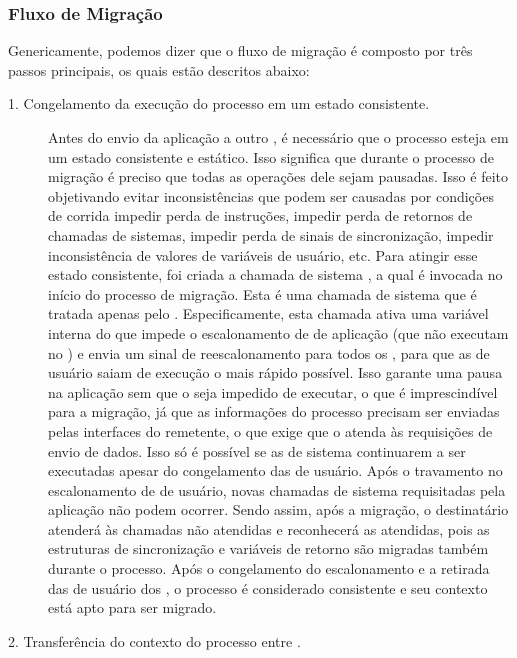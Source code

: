 \subsubsection{Fluxo de Migração}\label{sec.fluxo-migracao}

Genericamente, podemos dizer que o fluxo de migração é composto por três passos principais, os quais estão descritos abaixo:
\begin{description}
	\item[1. Congelamento da execução do processo em um estado consistente.] \hfill
	
    Antes do envio da aplicação a outro \cluster, é necessário que o processo esteja em um estado consistente e estático. Isso significa que durante o processo de migração é preciso que todas as operações dele sejam pausadas. Isso é feito objetivando evitar inconsistências que podem ser causadas por condições de corrida \eg impedir perda de instruções, impedir perda de retornos de chamadas de sistemas, impedir perda de sinais de sincronização, impedir inconsistência de valores de variáveis de usuário, etc. 
    Para atingir esse estado consistente, foi criada a chamada de sistema \freeze, a qual é invocada no início do processo de migração. Esta é uma chamada de sistema que é tratada apenas pelo \mcore. Especificamente, esta chamada ativa uma variável interna do \so que impede o escalonamento de \threads de aplicação (\threads que não executam no \mcore) e envia um sinal de reescalonamento para todos os \scores, para que as \threads de usuário saiam de execução o mais rápido possível. Isso garante uma pausa na aplicação sem que o \so seja impedido de executar, o que é imprescindível para a migração, já que as informações do processo precisam ser enviadas pelas interfaces \noc do \cluster remetente, o que exige que o \so atenda às requisições de envio de dados. Isso só é possível se as \threads de sistema continuarem a ser executadas apesar do congelamento das de usuário.
    Após o travamento no escalonamento de \threads de usuário, novas chamadas de sistema requisitadas pela aplicação não podem ocorrer. Sendo assim, após a migração, o \cluster destinatário atenderá às chamadas não atendidas e reconhecerá as atendidas, pois as estruturas de sincronização e variáveis de retorno são migradas também durante o processo. Após o congelamento do escalonamento e a retirada das \threads de usuário dos \scores, o processo é considerado consistente e seu contexto está apto para ser migrado.
    
	\item[2. Transferência do contexto do processo entre \clusters.] \hfill
    

\end{description}
